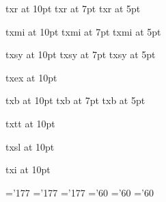 
\font\tenrm txr at 10pt
\font\sevenrm txr at 7pt
\font\fiverm txr at 5pt

\font\teni txmi at 10pt
\font\seveni txmi at 7pt
\font\fivei txmi at 5pt

\font\tensy txsy at 10pt
\font\sevensy txsy at 7pt
\font\fivesy txsy at 5pt

\font\tenex txex at 10pt

\font\tenbf txb at 10pt
\font\sevenbf txb at 7pt
\font\fivebf txb at 5pt

\font\tentt txtt at 10pt

\font\tensl txsl at 10pt

\font\tenit txi at 10pt

\skewchar\teni='177 \skewchar\seveni='177 \skewchar\fivei='177
\skewchar\tensy='60 \skewchar\sevensy='60 \skewchar\fivesy='60

\tenrm
{}\sevenrm
{}\fiverm

\teni
{}\seveni
{}\fivei

\tensy
{}\sevensy
{}\fivesy

\tenex
{}\tenex
{}\tenex

\textfont\itfam\tenit

\textfont\slfam\tensl

\textfont\bffam\tenbf
\scriptfont\bffam\sevenbf
\scriptscriptfont\bffam\fivebf

\textfont\ttfam\tentt

\rm
